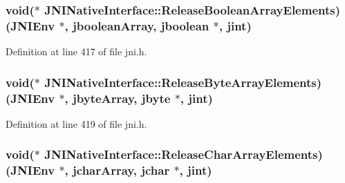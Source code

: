 \hypertarget{struct_j_n_i_native_interface_a6050a32623e56a2c516df881169ca3b2}{
\subsubsection[{Release\-Boolean\-Array\-Elements}]{\setlength{\rightskip}{0pt plus 5cm}void($\ast$ J\-N\-I\-Native\-Interface\-::\-Release\-Boolean\-Array\-Elements)({\bf J\-N\-I\-Env} $\ast$, {\bf jboolean\-Array}, {\bf jboolean} $\ast$, {\bf jint})}}\label{struct_j_n_i_native_interface_a6050a32623e56a2c516df881169ca3b2}


Definition at line 417 of file jni.\-h.

\hypertarget{struct_j_n_i_native_interface_aa26f856b90fa920195d86cb4b76f4403}{
\subsubsection[{Release\-Byte\-Array\-Elements}]{\setlength{\rightskip}{0pt plus 5cm}void($\ast$ J\-N\-I\-Native\-Interface\-::\-Release\-Byte\-Array\-Elements)({\bf J\-N\-I\-Env} $\ast$, {\bf jbyte\-Array}, {\bf jbyte} $\ast$, {\bf jint})}}\label{struct_j_n_i_native_interface_aa26f856b90fa920195d86cb4b76f4403}


Definition at line 419 of file jni.\-h.

\hypertarget{struct_j_n_i_native_interface_a36441f911b985a059e13853cff72ede7}{
\subsubsection[{Release\-Char\-Array\-Elements}]{\setlength{\rightskip}{0pt plus 5cm}void($\ast$ J\-N\-I\-Native\-Interface\-::\-Release\-Char\-Array\-Elements)({\bf J\-N\-I\-Env} $\ast$, {\bf jchar\-Array}, {\bf jchar} $\ast$, {\bf jint})}}\label{struct_j_n_i_native_interface_a36441f911b985a059e13853cff72ede7}


